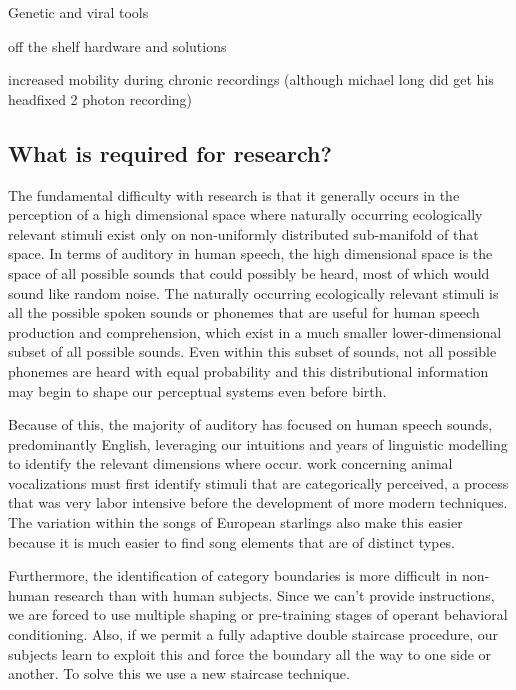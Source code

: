 Genetic and viral tools

off the shelf hardware and solutions

increased mobility during chronic recordings (although michael long did get his headfixed 2 photon recording)

\subsection{What is required for \CP research?}

The fundamental difficulty with \CP research is that it generally occurs in the perception of a high dimensional space where naturally occurring ecologically relevant stimuli exist only on non-uniformly distributed sub-manifold of that space. In terms of auditory \CP in human speech, the high dimensional space is the space of all possible sounds that could possibly be heard, most of which would sound like random noise. The naturally occurring ecologically relevant stimuli is all the possible spoken sounds or phonemes that are useful for human speech production and comprehension, which exist in a much smaller lower-dimensional subset of all possible sounds. Even within this subset of sounds, not all possible phonemes are heard with equal probability and this distributional information may begin to shape our perceptual systems even before birth.

Because of this, the majority of auditory \CP has focused on human speech sounds, predominantly English, leveraging our intuitions and years of linguistic modelling to identify the relevant dimensions where \CP occur. \CP work concerning animal vocalizations must first identify stimuli that are categorically perceived, a process that was very labor intensive\cite{swamp sparrow series of papers} before the development of more modern techniques\cite{Tim's paper on distribution}. The variation within the songs of European starlings also make this easier because it is much easier to find song elements that are of distinct types.

Furthermore, the identification of category boundaries is more difficult in non-human research than with human subjects. Since we can't provide instructions, we are forced to use multiple shaping or pre-training stages of operant behavioral conditioning. Also, if we permit a fully adaptive double staircase procedure, our subjects learn to exploit this and force the boundary all the way to one side or another. To solve this we use a new staircase technique.

